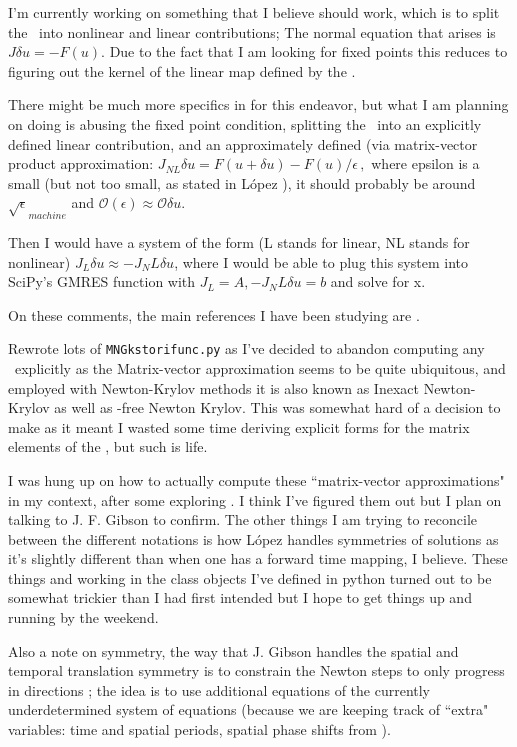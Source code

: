 I'm currently working on something that I believe should work, which is to split
the \jacobianM\ into nonlinear and linear contributions; The normal equation that
arises is $J \delta u = -F(u)$. Due to the fact that I am looking for fixed points
this reduces to figuring out the kernel of the linear map defined by the \jacobianM.

There might be much more specifics in for this endeavor, but what I am planning
on doing is abusing the fixed point condition, splitting the \jacobianM\ into
an explicitly defined linear contribution, and an approximately defined (via
matrix-vector product approximation:
\(
J_{NL} \delta u = F(u + \delta u) - F(u)/ \epsilon
\,,
\)
where epsilon is a small (but not too small, as stated in
L{\'o}pez \etal{}), it should probably be around $\sqrt{\epsilon}_{machine}$ and
$\mathcal{O}(\epsilon) \approx \mathcal{O} \delta u$.

Then I would have a system of the form (L stands for linear, NL stands for nonlinear)
$J_L \delta u \approx - J_NL \delta u$, where I would be able to plug this system
into SciPy's GMRES function with $J_L = A, -J_NL \delta u = b$ and solve for x.

On these comments, the main references I have been studying are
.

Rewrote lots of \texttt{MNGkstorifunc.py} as I've decided to abandon computing any \jacobianM\ explicitly
as the Matrix-vector approximation seems to be quite ubiquitous, and employed with Newton-Krylov methods it
is also known as Inexact Newton-Krylov as well as
\jacobianM-free Newton Krylov. This was somewhat hard of a decision to make as it meant I wasted some time
deriving explicit forms for the matrix elements of the \jacobianMs, but such is life.


I was hung up on how to actually compute these ``matrix-vector approximations"
in my context, after some exploring .
I think I've figured them out but I plan on talking to J. F. Gibson to confirm.
The other things I am trying to reconcile between the different notations is
how L{\'o}pez \etal{} handles symmetries of solutions as it's slightly different
than when one has a forward time mapping, I believe. These things and working in
the class objects I've defined in python turned out to be somewhat trickier
than I had first intended but I hope to get things up and running by the
weekend.

Also a note on symmetry, the way that J. Gibson
 handles the spatial and temporal
translation symmetry is to constrain the Newton steps to only progress in
directions ;
the idea is to use
additional equations of the currently underdetermined system of equations
(because we are keeping track of ``extra" variables: time and spatial periods,
spatial phase shifts from \rpo).

